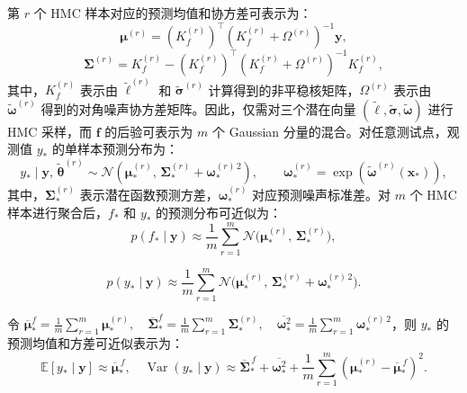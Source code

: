 \documentclass[]{interact}
\theoremstyle{plain}%
\theoremstyle{definition}
\theoremstyle{remark}
\begin{document}
第 $r$ 个 HMC 样本对应的预测均值和协方差可表示为：
\begin{equation}
	{{\boldsymbol{\mu }}^{(r)}} = {(K_f^{(r)})^ \top }{(K_f^{(r)} + {\Omega ^{(r)}})^{ - 1}}{\mathbf{y}},
\end{equation}
\begin{equation}
	{\boldsymbol{\Sigma}^{(r)}} = K_f^{(r)} - {(K_f^{(r)})^ \top }{(K_f^{(r)} + {\Omega ^{(r)}})^{ - 1}}K_f^{(r)},
\end{equation}
其中，$K_{f}^{(r)}$ 表示由 $\tilde{\boldsymbol{\ell}}^{(r)}$ 和 $\tilde{\boldsymbol{\sigma}}^{(r)}$ 计算得到的非平稳核矩阵，$\Omega^{(r)}$ 表示由 $\tilde{\boldsymbol{\omega}}^{(r)}$ 得到的对角噪声协方差矩阵。因此，仅需对三个潜在向量 $(\tilde{\boldsymbol{\ell}}, \tilde{\boldsymbol{\sigma}}, \tilde{\boldsymbol{\omega}})$ 进行 HMC 采样，而 $\mathbf{f}$ 的后验可表示为 $m$ 个 Gaussian 分量的混合。对任意测试点，观测值 $y_{*}$ 的单样本预测分布为：
\begin{equation}
	y_*
	\mid
	\mathbf{y},\,\widetilde{\boldsymbol{\theta}}^{(r)}
	\sim
	\mathcal{N}\!\left(
	\boldsymbol{\mu}_*^{(r)},
	\,\boldsymbol{\Sigma}_*^{(r)}+\boldsymbol{\omega}_*^{(r)\,2}
	\right),
	\qquad
	\boldsymbol{\omega}_*^{(r)}
	=
	\exp\!\left(
	\widetilde{\boldsymbol{\omega}}^{(r)}(\mathbf{x}_*)
	\right),
\end{equation}
其中，$\boldsymbol{\Sigma}_{*}^{(r)}$ 表示潜在函数预测方差，$\boldsymbol{\omega}_{*}^{(r)}$ 对应预测噪声标准差。对 $m$ 个 HMC 样本进行聚合后，$f_{*}$ 和 $y_{*}$ 的预测分布可近似为：
\begin{equation}
	p(f_*\mid \mathbf{y}) \approx \frac{1}{m}\sum_{r=1}^{m} \mathcal{N}\!\bigl(\boldsymbol{\mu}_*^{(r)},\, \boldsymbol{\Sigma}_*^{(r)}\bigr),
\end{equation}

\begin{equation}
	p(y_*\mid \mathbf{y}) \approx \frac{1}{m}\sum_{r=1}^{m} 
	\mathcal{N}\!\bigl(\boldsymbol{\mu}_*^{(r)},\, \boldsymbol{\Sigma}_*^{(r)} + \boldsymbol{\omega}_*^{(r)\,2}\bigr).
\end{equation}

令 $\overline{\boldsymbol{\mu}}_{*}^{f}
= \frac{1}{m}\sum_{r=1}^{m}\boldsymbol{\mu}_{*}^{(r)},\quad
\overline{\boldsymbol{\Sigma}}_{*}^{f}
= \frac{1}{m}\sum_{r=1}^{m}\boldsymbol{\Sigma}_{*}^{(r)},\quad
\overline{\boldsymbol{\omega}_{*}^{2}}
= \frac{1}{m}\sum_{r=1}^{m}\boldsymbol{\omega}_{*}^{(r)\,2}$，则 $y_{*}$ 的预测均值和方差可近似表示为：
\begin{equation}
	\mathbb{E}\!\left[{y_*}\mid \mathbf{y}\right]
	\approx \overline{\boldsymbol{\mu}}_{*}^{\,f},\quad
	\operatorname{Var}\!\left({y_*}\mid \mathbf{y}\right)
	\approx \overline{\boldsymbol{\Sigma}}_{*}^{\,f}
	+ \overline{\boldsymbol{\omega}_{*}^{2}}
	+ \frac{1}{m}\sum_{r=1}^{m}
	\left(\boldsymbol{\mu}_{*}^{(r)} - \overline{\boldsymbol{\mu}}_{*}^{\,f}\right)^{2}.
\end{equation}
\end{document}
